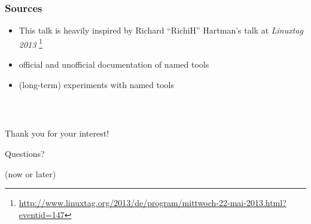 \documentclass[english,hyperref={pdfpagelabels=false},aspectratio=169]{beamer}
\begin{document}
\begin{frame}
  \frametitle{Sources}
  \begin{itemize}
    \item This talk is heavily inspired by Richard ``RichiH'' Hartman's talk at \textit{Linuxtag 2013}
      \footnote{\tiny\url{http://www.linuxtag.org/2013/de/program/mittwoch-22-mai-2013.html?eventid=147}}
    \item official and unofficial documentation of named tools
    \item (long-term) experiments with named tools
  \end{itemize}
\end{frame}

\begin{frame}
  \frametitle{~}
  \begin{center}
    {\huge Thank you for your interest!}\par
    \bigskip
    \bigskip
    \bigskip
    \bigskip
    {\Large Questions?}\par
    {\scriptsize\color{fzjgray50}(now or later)}
    \bigskip
    \bigskip
  \end{center}
\end{frame}
\end{document}
